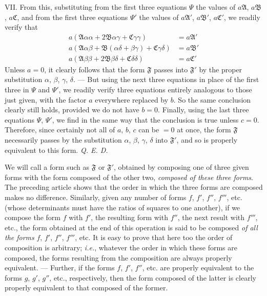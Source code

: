 VII. From this, substituting from the first three equations $\Psi$ the values of $a\mathfrak{A}$, $a\mathfrak{B}$, $a\mathfrak{C}$, and from the first three equations $\Psi'$ the values of $a\mathfrak{A}'$, $a\mathfrak{B}'$, $a\mathfrak{C}'$, we readily verify that
\[
\begin{aligned}
a(\mathfrak{A}\alpha\alpha+2\mathfrak{B}\alpha\gamma+\mathfrak{C}\gamma\gamma)&=a\mathfrak{A}'\\
a(\mathfrak{A}\alpha\beta+\mathfrak{B}(\alpha\delta+\beta\gamma)+\mathfrak{C}\gamma\delta)&=a\mathfrak{B}'\\
a(\mathfrak{A}\beta\beta+2\mathfrak{B}\beta\delta+\mathfrak{C}\delta\delta)&=a\mathfrak{C}'
\end{aligned}
\]
Unless $a=0$, it clearly follows that the form $\mathfrak{F}$ passes into $\mathfrak{F}'$ by the proper substitution $\alpha$, $\beta$, $\gamma$, $\delta$. --- But using the next three equations in place of the first three in $\Psi$ and $\Psi'$, we readily verify three equations entirely analogous to those just given, with the factor $a$ everywhere replaced by $b$. So the same conclusion clearly still holds, provided we do not have $b=0$. Finally, using the last three equations $\Psi$, $\Psi'$, we find in the same way that the conclusion is true unless $c=0$. Therefore, since certainly not all of $a$, $b$, $c$ can be $=0$ at once, the form $\mathfrak{F}$ necessarily passes by the substitution $\alpha$, $\beta$, $\gamma$, $\delta$ into $\mathfrak{F}'$, and so is properly equivalent to this form. \textit{Q. E. D.}

We will call a form such as $\mathfrak{F}$ or $\mathfrak{F}'$, obtained by composing one of three given forms with the form composed of the other two, \textit{composed of these three forms}. The preceding article shows that the order in which the three forms are composed makes no difference. Similarly, given any number of forms $f$, $f'$, $f''$, $f'''$, etc. (whose determinants must have the ratios of squares to one another), if we compose the form $f$ with $f'$, the resulting form with $f''$, the next result with $f'''$, etc., the form obtained at the end of this operation is said to be composed \textit{of all the forms} $f$, $f'$, $f''$, $f'''$, etc. It is easy to prove that here too the order of composition is arbitrary; \textit{i.e.}, whatever the order in which these forms are composed, the forms resulting from the composition are always properly equivalent. --- Further, if the forms $f$, $f'$, $f''$, etc. are properly equivalent to the forms $g$, $g'$, $g''$, etc., respectively, then the form composed of the latter is clearly properly equivalent to that composed of the former.
